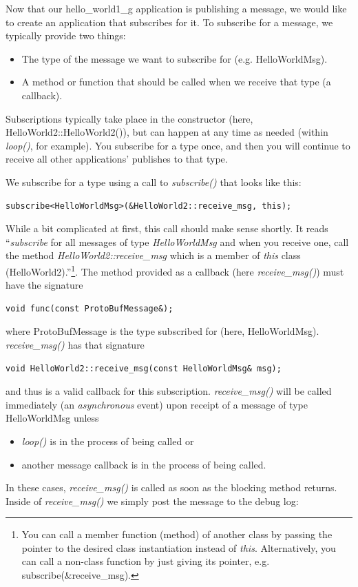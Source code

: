 \documentclass[11pt, letterpaper]{article}
\begin{document}
Now that our hello\_world1\_g application is publishing a message, we would like to create an application that subscribes for it. To subscribe for a message, we typically provide two things:
\begin{itemize}
\item The type of the message we want to subscribe for (e.g. HelloWorldMsg).
\item A method or function that should be called when we receive that type (a callback).
\end{itemize}

Subscriptions typically take place in the constructor (here, HelloWorld2::HelloWorld2()), but can happen at any time as needed (within \textit{loop()}, for example). You subscribe for a type once, and then you will continue to receive all other applications' publishes to that type.

We subscribe for a type using a call to \textit{subscribe()} that looks like this:
\begin{verbatim}
subscribe<HelloWorldMsg>(&HelloWorld2::receive_msg, this);
\end{verbatim}

While a bit complicated at first, this call should make sense shortly. It reads ``\textit{subscribe} for all messages of type \textit{HelloWorldMsg} and when you receive one, call the method \textit{HelloWorld2::receive\_msg} which is a member of \textit{this} class (HelloWorld2).''\footnote{You can call a member function (method) of another class by passing the pointer to the desired class instantiation instead of \textit{this}. Alternatively, you can call a non-class function by just giving its pointer, e.g. subscribe(\&receive\_msg).}. The method provided as a callback (here \textit{receive\_msg()}) must have the signature
\begin{verbatim}
void func(const ProtoBufMessage&); 
\end{verbatim}
where ProtoBufMessage is the type subscribed for (here, HelloWorldMsg). \textit{receive\_msg()} has that signature
\begin{verbatim}
void HelloWorld2::receive_msg(const HelloWorldMsg& msg);
\end{verbatim}
and thus is a valid callback for this subscription. \textit{receive\_msg()} will be called immediately (an \textit{asynchronous} event) upon receipt of a message of type HelloWorldMsg unless
\begin{itemize}
\item \textit{loop()} is in the process of being called or
\item another message callback is in the process of being called.
\end{itemize}
In these cases, \textit{receive\_msg()} is called as soon as the blocking method returns. Inside of \textit{receive\_msg()} we simply post the message to the debug log:
\end{document}
